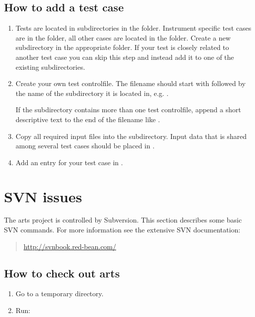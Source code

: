 \subsection{How to add a test case}
\begin{enumerate}
\item Tests are located in subdirectories in the 
  folder. Instrument specific test cases are in the
   folder, all other cases are
  located in the  folder. Create
  a new subdirectory in the appropriate folder. If your test is closely
  related to another test case you can skip this step and instead add it
  to one of the existing subdirectories.
\item Create your own test controlfile. The filename should start
  with  followed by the name
  of the subdirectory it is located in, e.g.
  .

  If the subdirectory contains more than one test controlfile,
  append a short descriptive text to the end of the filename like
  .
\item Copy all required input files into the subdirectory. Input data that is
  shared among several test cases should be placed in
  .
\item Add an entry for your test case in
  .
\end{enumerate}


\section{SVN issues}
 \label{sec:development:cvs}

The arts project is controlled by Subversion. This section describes some
basic SVN commands. For more information see the extensive SVN
documentation:
\begin{quote}
  \url{http://svnbook.red-bean.com/}
\end{quote}




\subsection{How to check out arts}
\begin{enumerate}
\item Go to a temporary directory.
\item Run: 
\end{enumerate}


